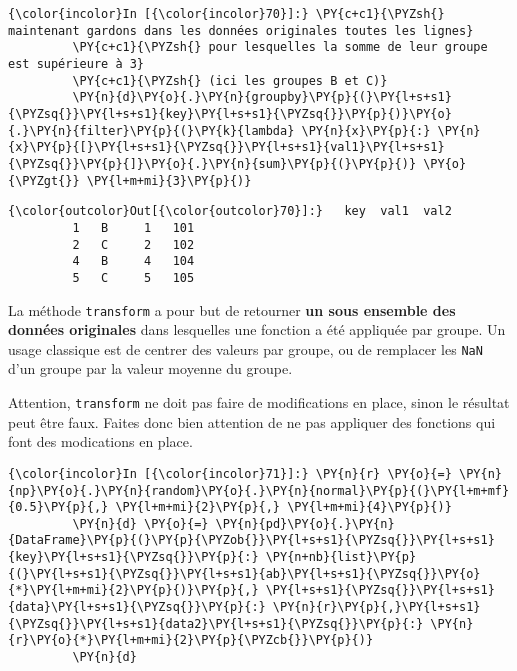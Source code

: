     \begin{Verbatim}[commandchars=\\\{\}]
{\color{incolor}In [{\color{incolor}70}]:} \PY{c+c1}{\PYZsh{} maintenant gardons dans les données originales toutes les lignes}
         \PY{c+c1}{\PYZsh{} pour lesquelles la somme de leur groupe est supérieure à 3}
         \PY{c+c1}{\PYZsh{} (ici les groupes B et C)}
         \PY{n}{d}\PY{o}{.}\PY{n}{groupby}\PY{p}{(}\PY{l+s+s1}{\PYZsq{}}\PY{l+s+s1}{key}\PY{l+s+s1}{\PYZsq{}}\PY{p}{)}\PY{o}{.}\PY{n}{filter}\PY{p}{(}\PY{k}{lambda} \PY{n}{x}\PY{p}{:} \PY{n}{x}\PY{p}{[}\PY{l+s+s1}{\PYZsq{}}\PY{l+s+s1}{val1}\PY{l+s+s1}{\PYZsq{}}\PY{p}{]}\PY{o}{.}\PY{n}{sum}\PY{p}{(}\PY{p}{)} \PY{o}{\PYZgt{}} \PY{l+m+mi}{3}\PY{p}{)}
\end{Verbatim}


\begin{Verbatim}[commandchars=\\\{\}]
{\color{outcolor}Out[{\color{outcolor}70}]:}   key  val1  val2
         1   B     1   101
         2   C     2   102
         4   B     4   104
         5   C     5   105
\end{Verbatim}
            
    La méthode \texttt{transform} a pour but de retourner \textbf{un sous
ensemble des données originales} dans lesquelles une fonction a été
appliquée par groupe. Un usage classique est de centrer des valeurs par
groupe, ou de remplacer les \texttt{NaN} d'un groupe par la valeur
moyenne du groupe.

Attention, \texttt{transform} ne doit pas faire de modifications en
place, sinon le résultat peut être faux. Faites donc bien attention de
ne pas appliquer des fonctions qui font des modications en place.

    \begin{Verbatim}[commandchars=\\\{\}]
{\color{incolor}In [{\color{incolor}71}]:} \PY{n}{r} \PY{o}{=} \PY{n}{np}\PY{o}{.}\PY{n}{random}\PY{o}{.}\PY{n}{normal}\PY{p}{(}\PY{l+m+mf}{0.5}\PY{p}{,} \PY{l+m+mi}{2}\PY{p}{,} \PY{l+m+mi}{4}\PY{p}{)}
         \PY{n}{d} \PY{o}{=} \PY{n}{pd}\PY{o}{.}\PY{n}{DataFrame}\PY{p}{(}\PY{p}{\PYZob{}}\PY{l+s+s1}{\PYZsq{}}\PY{l+s+s1}{key}\PY{l+s+s1}{\PYZsq{}}\PY{p}{:} \PY{n+nb}{list}\PY{p}{(}\PY{l+s+s1}{\PYZsq{}}\PY{l+s+s1}{ab}\PY{l+s+s1}{\PYZsq{}}\PY{o}{*}\PY{l+m+mi}{2}\PY{p}{)}\PY{p}{,} \PY{l+s+s1}{\PYZsq{}}\PY{l+s+s1}{data}\PY{l+s+s1}{\PYZsq{}}\PY{p}{:} \PY{n}{r}\PY{p}{,}\PY{l+s+s1}{\PYZsq{}}\PY{l+s+s1}{data2}\PY{l+s+s1}{\PYZsq{}}\PY{p}{:} \PY{n}{r}\PY{o}{*}\PY{l+m+mi}{2}\PY{p}{\PYZcb{}}\PY{p}{)}
         \PY{n}{d}
\end{Verbatim}


